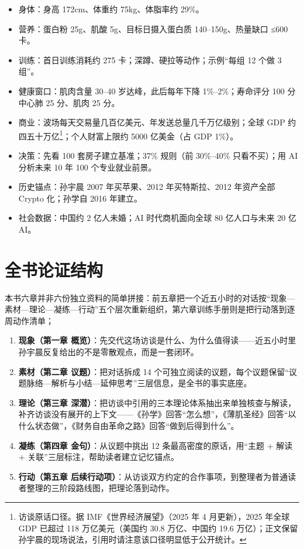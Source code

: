 \begin{itemize}
\tightlist
\item
  身体：身高 172cm、体重约 75kg、体脂率约 29\%。
\item
  营养：蛋白粉 25g、肌酸 5g、目标日摄入蛋白质 140--150g、热量缺口 ≤600
  卡。
\item
  训练：首日训练消耗约 275 卡；深蹲、硬拉等动作；示例``每组 12 个做 3
  组''。
\item
  健康窗口：肌肉含量 30--40 岁达峰，此后每年下降 1\%--2\%；寿命评分 100
  分中心肺 25 分、肌肉 25 分。
\item
  商业：波场每天交易量几百亿美元、年发送总量几千万亿级别；全球 GDP
  约四五十万亿\footnote{访谈原话口径。据 IMF《世界经济展望》（2025 年 4
    月更新），2025 年全球 GDP 已超过 118 万亿美元（美国约 30.8
    万亿、中国约 19.6
    万亿）；正文保留孙宇晨的现场说法，引用时请注意该口径明显低于公开统计。}；个人财富上限约
  5000 亿美金（占 GDP 1\%）。
\item
  决策：先看 100 套房子建立基准；37\% 规则（前 30\%--40\% 只看不买）；用
  AI 分析未来 10 年 100 个专业就业前景。
\item
  历史锚点：孙宇晨 2007 年买苹果、2012 年买特斯拉、2012 年资产全部
  Crypto 化；孙学自 2016 年建立。
\item
  社会数据：中国约 2 亿人未婚；AI 时代商机面向全球 80 亿人口与未来 20 亿
  AI。
\end{itemize}

\section{全书论证结构}

本书六章并非六份独立资料的简单拼接：前五章把一个近五小时的对话按``现象---素材---理论---凝练---行动''五个层次重新组织，第六章训练手册则是把行动落到逐周动作清单；

\begin{enumerate}
\def\labelenumi{\arabic{enumi}.}
\tightlist
\item
  \textbf{现象（第一章
  概览）}：先交代这场访谈是什么、为什么值得读------近五小时里孙宇晨反复给出的不是零散观点，而是一套闭环。
\item
  \textbf{素材（第二章 议题）}：把对话拆成 14
  个可独立阅读的议题，每个议题保留``议题脉络---解析与小结---延伸思考''三层信息，是全书的事实底座。
\item
  \textbf{理论（第三章
  深潜）}：把访谈中引用的三本理论体系抽出来单独核查与解读，补齐访谈没有展开的上下文------《孙学》回答``怎么想''，《薄肌圣经》回答``以什么状态做''，《财务自由革命之路》回答``做到后得到什么''。
\item
  \textbf{凝练（第四章 金句）}：从议题中挑出 12
  条最高密度的原话，用``主题 + 解读 +
  关联''三层标注，帮助读者建立记忆锚点。
\item
  \textbf{行动（第五章
  后续行动项）}：从访谈双方约定的合作事项，到整理者为普通读者整理的三阶段路线图，把理论落到动作。
\end{enumerate}

